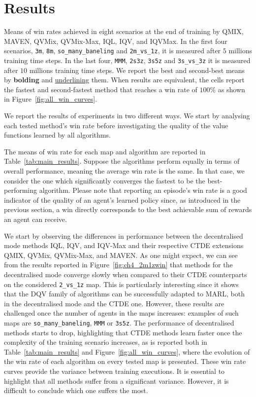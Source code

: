 \section{Results} \label{sec:ch4_results}
\begin{table}
    \centering
    
    \caption{
    Means of win rates achieved in eight scenarios at the end of training by QMIX, MAVEN, QVMix, QVMix-Max, IQL, IQV, and IQVMax. 
    In the first four scenarios, \texttt{3m}, \texttt{8m}, \texttt{so\_many\_baneling} and \texttt{2m\_vs\_1z}, it is measured after $5$ millions training time steps.
    In the last four, \texttt{MMM}, \texttt{2s3z}, \texttt{3s5z} and \texttt{3s\_vs\_3z} it is measured after $10$ millions training time steps.
    We report the best and second-best means by \textbf{bolding} and \underline{underlining} them. When results are equivalent, the cells report the fastest and second-fastest method that reaches a win rate of $100\%$ as shown in Figure~\ref{fig:all_win_curves}.}
    \label{tab:main_results}
\end{table}

We report the results of experiments in two different ways.
We start by analysing each tested method's win rate before investigating the quality of the value functions learned by all algorithms.

The means of win rate for each map and algorithm are reported in Table~\ref{tab:main_results}. 
Suppose the algorithms perform equally in terms of overall performance, meaning the average win rate is the same. 
In that case, we consider the one which significantly converges the fastest to be the best-performing algorithm.
Please note that reporting an episode's win rate is a good indicator of the quality of an agent's learned policy since, as introduced in the previous section, a win directly corresponds to the best achievable sum of rewards an agent can receive.

We start by observing the differences in performance between the decentralised mode methods IQL, IQV, and IQV-Max and their respective CTDE extensions QMIX, QVMix, QVMix-Max, and MAVEN.
As one might expect, we can see from the results reported in Figure~\ref{fig:ch4_2m1zwin} that methods for the decentralised mode converge slowly when compared to their CTDE counterparts on the considered \texttt{2\_vs\_1z} map.
This is particularly interesting since it shows that the DQV family of algorithms can be successfully adapted to MARL, both in the decentralised mode and the CTDE one.
However, these results are challenged once the number of agents in the maps increases: examples of such maps are \texttt{so\_many\_baneling}, \texttt{MMM} or \texttt{3s5z}.
The performance of decentralised methods starts to drop, highlighting that CTDE methods learn faster once the complexity of the training scenario increases, as is reported both in Table~\ref{tab:main_results} and Figure~\ref{fig:all_win_curves}, where the evolution of the win rate of each algorithm on every tested map is presented.
These win rate curves provide the variance between training executions.
It is essential to highlight that all methods suffer from a significant variance.
However, it is difficult to conclude which one suffers the most.

